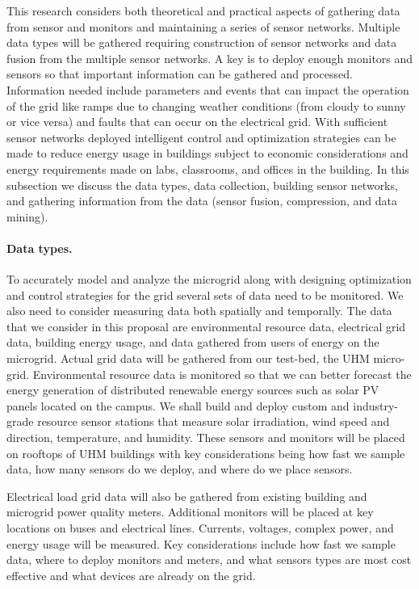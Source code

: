 This research considers both theoretical and practical aspects of gathering
data from sensor and monitors and maintaining a series of
sensor networks.  Multiple data types will be gathered
requiring construction of sensor networks and data fusion from the multiple
sensor networks.  A key is to deploy enough monitors and sensors so that
important information can be gathered and processed.  Information 
needed include parameters and  events that can impact the operation of the 
grid like ramps due to changing weather conditions (from cloudy to sunny or vice versa) 
and faults that can occur on the electrical grid.  With sufficient sensor networks deployed
intelligent control and optimization strategies can be made to reduce
energy usage in buildings subject to economic considerations and energy
requirements made on labs, classrooms, and offices in the building.  In
this subsection we discuss the data types, data collection, building sensor
networks, and gathering information from the data (sensor fusion,
compression, and data mining).
 
\paragraph{Data types.}
 
To accurately model and analyze the microgrid along with designing
optimization and control strategies for the grid several sets of data need
to be monitored.  We also need to consider measuring data both spatially
and temporally.  The data that we consider in this proposal are
environmental resource data, electrical grid data, building energy usage,
and data gathered from users of energy on the microgrid.  Actual grid data will be gathered from our test-bed, the UHM micro-grid.  
Environmental resource data is monitored so that we can better forecast the energy generation of distributed  renewable energy sources such as solar PV panels located on the campus. We shall build and deploy custom and industry-grade resource sensor stations that measure solar irradiation, wind speed and direction, temperature, and humidity. These sensors and monitors will be placed on rooftops of UHM buildings with key considerations being how fast we sample data, how many sensors do we deploy, and where do we place sensors.
 
Electrical load grid data will also be gathered from existing building and microgrid power quality meters. Additional monitors will be placed at key locations on buses and electrical lines. Currents, voltages, complex power, and energy usage will be measured.  Key considerations include how fast we sample data, where to deploy monitors and meters, and what sensors types are most cost effective and what devices are already on the grid.
 
